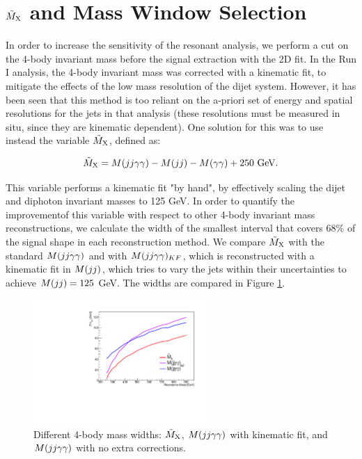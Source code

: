 \section{ $\tilde{M}_{\mathrm{X}}$ and Mass Window Selection}
\label{sec:masswindow}

In order to increase the sensitivity of the resonant analysis, we perform a cut on the 4-body invariant mass before the signal extraction with the 2D fit.
In the Run I analysis, the 4-body invariant mass was corrected with a kinematic fit, to mitigate the effects of the low mass resolution of the dijet system.
However, it has been seen that this method is too reliant on the a-priori set of energy and spatial resolutions for the jets in that analysis (these resolutions must be measured in situ, since they are kinematic dependent).
One solution for this was to use instead the variable $\tilde{M}_{\mathrm{X}}$, defined as:

\begin{equation}
\tilde{M}_{\mathrm{X}} = M(jj\gamma\gamma) - M(jj) - M(\gamma\gamma) + 250 \text{ GeV}.
\end{equation}

This variable performs a kinematic fit "by hand", by effectively scaling the dijet and diphoton invariant masses to 125 GeV. 
In order to quantify the improvementof this variable with respect to other 4-body invariant mass reconstructions, we calculate the width of the smallest interval that covers $68\%$ of the signal shape in each reconstruction method. 
We compare $\tilde{M}_{\mathrm{X}}$ with the standard $M(jj\gamma\gamma)$ and with $M(jj\gamma\gamma)_{KF}$, which is reconstructed with a kinematic fit in $M(jj)$, which tries to vary the jets within their uncertainties to achieve $M(jj) = 125$ GeV. 
The widths are compared in Figure \ref{fig:mxwidth}. 

\begin{figure}[h]
  \centering
  \includegraphics[width=0.6\textwidth]{figures/sec-window/width_67_prime.pdf}\hfil
  \caption{Different 4-body mass widths: $\tilde{M}_{\mathrm{X}}$, $M(jj\gamma\gamma)$ with kinematic fit, and $M(jj\gamma\gamma)$ with no extra corrections.}
  \label{fig:mxwidth}
\end{figure}

